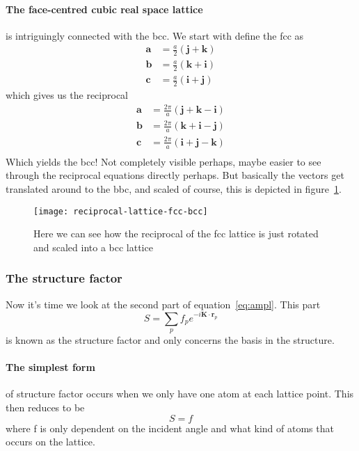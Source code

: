 \documentclass[11pt]{article}
\begin{document}
\paragraph{The face-centred cubic real space lattice} is intriguingly connected with the bcc. We start with define the fcc as
\begin{align}
	\mathbf{a} &= \frac{a}{2} (\mathbf{j} + \mathbf{k}) \nonumber\\
	\mathbf{b} &= \frac{a}{2} (\mathbf{k} + \mathbf{i}) \nonumber\\
	\mathbf{c} &= \frac{a}{2} (\mathbf{i} + \mathbf{j}) 
\end{align}
which gives us the reciprocal
\begin{align}
	\mathbf{a} &= \frac{2\pi}{a} (\mathbf{j} + \mathbf{k} - \mathbf{i}) \nonumber\\
	\mathbf{b} &= \frac{2\pi}{a} (\mathbf{k} + \mathbf{i} - \mathbf{j}) \nonumber\\
	\mathbf{c} &= \frac{2\pi}{a} (\mathbf{i} + \mathbf{j} - \mathbf{k}) \nonumber\\
\end{align}
Which yields the bcc! Not completely visible perhaps, maybe easier to see through the reciprocal equations directly perhaps. But basically the vectors get translated around to the bbc, and scaled of course, this is depicted in figure~\ref{fig:fcc-bcc}.
\begin{figure}[!ht]
	\centering
	\texttt{[image: reciprocal-lattice-fcc-bcc]}
	\caption{Here we can see how the reciprocal of the fcc lattice is just rotated and scaled into a bcc lattice}
	\label{fig:fcc-bcc}
\end{figure}

\newpage
\subsubsection{The structure factor}
Now it's time we look at the second part of equation~\ref{eq:ampl}. This part 
\begin{equation}
	S = \sum_p f_p e^{-i\mathbf{K} \cdot \mathbf{r}_p}
	\label{eq:structure-factor}
\end{equation}
is known as the structure factor and only concerns the basis in the structure. 

\paragraph{The simplest form} of structure factor occurs when we only have one atom at each lattice point. This then reduces to be 
\begin{equation}
	S = f
\end{equation}
where f is only dependent on the incident angle and what kind of atoms that occurs on the lattice.
\end{document}
